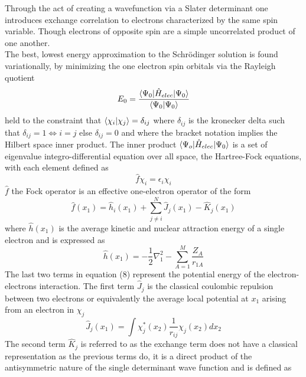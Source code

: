     Through the act of creating a wavefunction via a Slater determinant one introduces exchange correlation to electrons characterized by the same spin variable.  Though electrons of opposite spin are a simple uncorrelated product of one another.\\
    The best, lowest energy approximation to the Schr{\"o}dinger solution is found variationally, by minimizing the one electron spin orbitals via the Rayleigh quotient
      \begin{equation}
      E_{0} = \frac{\langle\Psi_{0} | \hat{H}_{elec} | \Psi_{0} \rangle}{\langle\Psi_{0}|\Psi_{0}\rangle}
      \end{equation}
    held to the constraint that $\langle \chi_i|\chi_j\rangle = \delta_{ij}$ where $\delta_{ij}$ is the kronecker delta such that $\delta_{ij}=1\iff i=j$ else $\delta_{ij} = 0$ and where the bracket notation implies the Hilbert space inner product.  The inner product $\langle\Psi_{o} | \hat{H}_{elec} | \Psi_{0} \rangle$ is a set of eigenvalue integro-differential equation over all space, the Hartree-Fock equations, with each element defined as 
      \begin{equation}
      \hat{f}\chi_i = \epsilon_i \chi_i
      \end{equation}
    $\hat{f}$ the Fock operator is an effective one-electron operator of the form 
      \begin{equation}
      \hat{f}(x_1) = \hat{h}_i(x_1)  + \sum_{j\neq i}^N \hat{J}_j(x_1) - \hat{K}_j(x_1)
      \end{equation}
    where $\hat{h}(x_1)$ is the average kinetic and nuclear attraction energy of a single electron and is expressed as 
      \begin{equation}
      \hat{h}(x_1) = -\frac{1}{2} \nabla_1^2 - \sum_{A=1}^M \frac{Z_A}{r_{1A}}
      \end{equation}
    The last two terms in equation (8) represent the potential energy of the electron-electrons interaction.  The first term $\hat{J}_j$ is the classical coulombic repulsion between two electrons or equivalently the average local potential at $x_1$ arising from an electron in $\chi_j$
      \begin{equation}
      \hat{J}_j(x_1) = \int \chi_j^*(x_2) \frac{1}{r_{ij}} \chi_j(x_2) dx_2
      \end{equation}
    The second term $\hat{K}_j$ is referred to as the exchange term does not have a classical representation as the previous terms do, it is a direct product of the antisymmetric nature of the single determinant wave function and is defined as 
